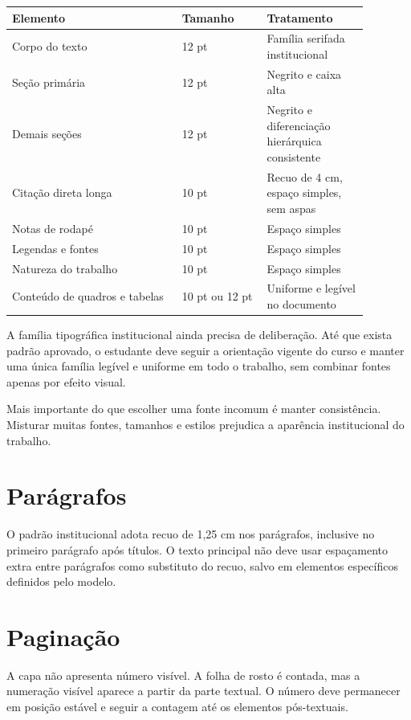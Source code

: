 \begin{longtable}{p{0.42\linewidth}p{0.21\linewidth}p{0.25\linewidth}}
\toprule
Elemento & Tamanho & Tratamento \\
\midrule
Corpo do texto & 12 pt & Família serifada institucional \\
Seção primária & 12 pt & Negrito e caixa alta \\
Demais seções & 12 pt & Negrito e diferenciação hierárquica consistente \\
Citação direta longa & 10 pt & Recuo de 4 cm, espaço simples, sem aspas \\
Notas de rodapé & 10 pt & Espaço simples \\
Legendas e fontes & 10 pt & Espaço simples \\
Natureza do trabalho & 10 pt & Espaço simples \\
Conteúdo de quadros e tabelas & 10 pt ou 12 pt & Uniforme e legível no documento \\
\bottomrule
\end{longtable}

\fluxopendente

A família tipográfica institucional ainda precisa de deliberação. Até que exista padrão aprovado, o estudante deve seguir a orientação vigente do curso e manter uma única família legível e uniforme em todo o trabalho, sem combinar fontes apenas por efeito visual.

Mais importante do que escolher uma fonte incomum é manter consistência. Misturar muitas fontes, tamanhos e estilos prejudica a aparência institucional do trabalho.

\section{Parágrafos}

O padrão institucional adota recuo de 1,25 cm nos parágrafos, inclusive no primeiro parágrafo após títulos. O texto principal não deve usar espaçamento extra entre parágrafos como substituto do recuo, salvo em elementos específicos definidos pelo modelo.

\section{Paginação}

A capa não apresenta número visível. A folha de rosto é contada, mas a numeração visível aparece a partir da parte textual. O número deve permanecer em posição estável e seguir a contagem até os elementos pós-textuais.

